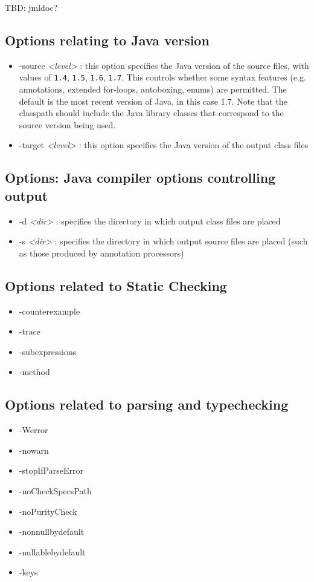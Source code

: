 \documentclass{report}%
\begin{document}
TBD: jmldoc?

\subsection{Options relating to Java version}

\begin{itemize}
\item -source {\it <level>} : this option specifies the Java version of the source files, with values of
{\tt 1.4}, {\tt 1.5}, {\tt 1.6}, {\tt 1.7}. This controls whether some syntax features  
(e.g. annotations, extended for-loops, autoboxing, enums) are permitted. The default is the most recent version
of Java, in this case 1.7.  Note that the classpath should include the Java library classes that
correspond to the source version being used.

\item -target {\it <level>} : this option specifies the Java version of the output class files
\end{itemize}


\subsection{Options: Java compiler options controlling output}

\begin{itemize}
\item -d {\it <dir>} : specifies the directory in which output class files are placed
\item -s {\it <dir>} : specifies the directory in which output source files are placed (such as those produced by annotation processors)
\end{itemize}


\subsection{Options related to Static Checking}
\begin{itemize}
\item -counterexample
\item -trace
\item -subexpressions
\item -method
\end{itemize}

\subsection{Options related to parsing and typechecking}
\begin{itemize}
\item -Werror
\item -nowarn
\item -stopIfParseError
\item -noCheckSpecsPath
\item -noPurityCheck
\item -nonnullbydefault
\item -nullablebydefault
\item -keys
\end{itemize}
\end{document}
